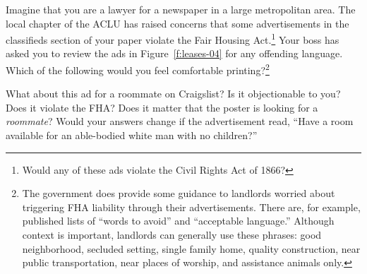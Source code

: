 
Imagine that you are a lawyer for a newspaper in a large metropolitan area.  The
local chapter of the ACLU has raised concerns that some advertisements in the
classifieds section of your paper violate the Fair Housing
Act.\footnote{Would any of these ads violate the Civil Rights Act of
1866?}  Your boss has asked you to review the ads in Figure~\ref{f:leases-04}
for any offending language. Which of the following would you feel comfortable
printing?\footnote{The government does provide some guidance to landlords
worried about triggering FHA liability through their advertisements.  There are,
for example, published lists of ``words to avoid'' and ``acceptable language.''
Although context is important, landlords can generally use these phrases: good
neighborhood, secluded setting, single family home, quality construction, near
public transportation, near places of worship, and assistance animals only.} 


What about this ad for a roommate on Craigslist?  Is it objectionable to you?
Does it violate the FHA?  Does it matter that the poster is looking for a
\textit{roommate}? Would your answers change if the advertisement read, ``Have
a room available for an able-bodied white man with no children?'' 


